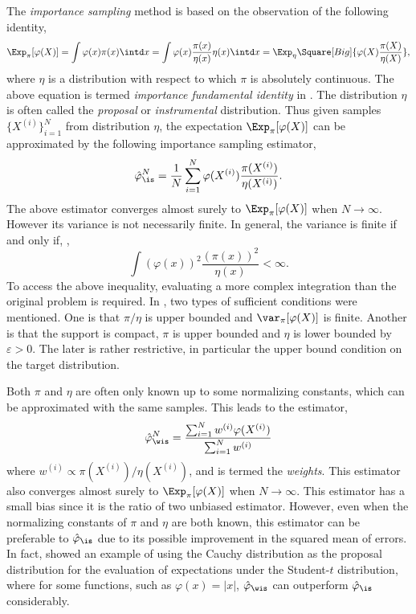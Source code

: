 The \emph{importance sampling} method is based on the observation of the
following identity,
\begin{equation}
  \Exp_{\pi}[\varphi(X)]
  = \int\varphi(x)\pi(x)\intd x
  = \int\varphi(x)\frac{\pi(x)}{\eta(x)}\eta(x)\intd x
  = \Exp_{\eta}\Square[Big]{\varphi(X)\frac{\pi(X)}{\eta(X)}},
  \label{eq:impotance fundamental}
\end{equation}
where $\eta$ is a distribution with respect to which $\pi$ is absolutely
continuous. The above equation is termed \emph{importance fundamental
  identity} in \cite{Robert:2004tn}. The distribution $\eta$ is often called
the \emph{proposal} or \emph{instrumental} distribution. Thus given \iid
samples $\{X^{(i)}\}_{i=1}^N$ from distribution $\eta$, the expectation
$\Exp_{\pi}[\varphi(X)]$ can be approximated by the following importance
sampling estimator,
\begin{equation}
  \hat\varphi_{\is}^N
  = \frac{1}{N}\sum_{i=1}^N\varphi(X^{(i)})\frac{\pi(X^{(i)})}{\eta(X^{(i)})}.
  \label{eq:is normalized}
\end{equation}
The above estimator converges almost surely to $\Exp_{\pi}[\varphi(X)]$ when
$N\to\infty$. However its variance is not necessarily finite. In general, the
variance is finite if and only if, \cite[][sec.~3.3.2]{Robert:2004tn},
\begin{equation}
  \int(\varphi(x))^2\frac{(\pi(x))^2}{\eta(x)} < \infty.
\end{equation}
To access the above inequality, evaluating a more complex integration than the
original problem is required. In \cite{Geweke:1989tm}, two types of sufficient
conditions were mentioned. One is that $\pi/\eta$ is upper bounded and
$\var_{\pi}[\varphi(X)]$ is finite. Another is that the support is compact,
$\pi$ is upper bounded and $\eta$ is lower bounded by $\varepsilon > 0$. The
later is rather restrictive, in particular the upper bound condition on the
target distribution.

Both $\pi$ and $\eta$ are often only known up to some normalizing constants,
which can be approximated with the same samples. This leads to the estimator,
\begin{equation}
  \hat\varphi_{\wis}^N
  = \frac{\sum_{i=1}^Nw^{(i)}\varphi(X^{(i)})}{\sum_{i=1}^Nw^{(i)}}
  \label{eq:is unnormalized}
\end{equation}
where $w^{(i)} \propto \pi(X^{(i)})/\eta(X^{(i)})$, and is termed the
\emph{weights}. This estimator also converges almost surely to
$\Exp_{\pi}[\varphi(X)]$ when $N\to\infty$. This estimator has a small
bias since it is the ratio of two unbiased estimator. However, even when the
normalizing constants of $\pi$ and $\eta$ are both known, this estimator can
be preferable to $\hat\varphi_{\is}$ due to its possible improvement in the
squared mean of errors. In fact, \cite{Casella:1998tj} showed an example of
using the Cauchy distribution as the proposal distribution for the evaluation
of expectations under the Student-$t$ distribution, where for some
functions, such as $\varphi(x) = |x|$, $\hat\varphi_{\wis}$ can
outperform $\hat\varphi_{\is}$ considerably.

